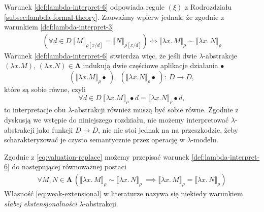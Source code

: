 Warunek \ref{def:lambda-interpret-6} odpowiada regule \((\xi)\) z Rodrozdziału \ref{subsec:lambda-formal-theory}.
Zauważmy wpierw jednak, że zgodnie z warunkiem \ref{def:lambda-interpret-3}
\begin{align*}
  (\forall d\in D\ \llbracket M \rrbracket_{\rho[x/d]}=\llbracket N \rrbracket_{\rho[x/d]})
\iff
\llbracket\lambda x.\,M\rrbracket_\rho \sim \llbracket \lambda x.\,N\rrbracket_\rho 
\tag{\dagger\dagger}\label{eq:valuation-replace}
\end{align*}
Warunek \ref{def:lambda-interpret-6} stwierdza więc, że jeśli dwie \(\lambda\)-abstrakcje 
\((\lambda x. M)\), \((\lambda x. N)\in\mathbf{\Lambda}\) indukują dwie częściowe aplikacje działania \(\bullet\)
\[(\llbracket \lambda x. M \rrbracket_\rho\bullet\ ),\ (\llbracket \lambda x. N \rrbracket_\rho\bullet\ ):\: D\to D,\]
które są sobie równe, czyli
\[
\forall d\in D\ \llbracket \lambda x. M \rrbracket_\rho\bullet d = \llbracket \lambda x. N \rrbracket_\rho\bullet d,
\]
to interpretacje obu \(\lambda\)-abstrakcji również muszą być sobie równe. Zgodnie z dyskusją we wstępie do niniejszego rozdziału,
nie możemy interpretować \(\lambda\)-abstrakcji jako funkcji \(D\to D\), nic nie stoi jednak na na przeszkodzie, żeby scharakteryzować je  
czysto semantycznie przez operację w \(\lambda\)-modelu.




Zgodnie z \eqref{eq:valuation-replace} możemy przepisać warunek \ref{def:lambda-interpret-6} do następującej równoważnej postaci
  \begin{align}
    \forall M,N\in\mathbf{\Lambda}\,\left(\llbracket\lambda x.\,M\rrbracket_\rho \sim \llbracket \lambda x.\,N\rrbracket_\rho\ \implies \llbracket \lambda x.\,M\rrbracket_\rho = \llbracket \lambda x.\,N\rrbracket_\rho\right)\tag{vi'}\label{eq:weak-extensional}
    \end{align}  
Własność \eqref{eq:weak-extensional} w literaturze nazywa się niekiedy warunkiem \emph{słabej ekstensjonalności} \(\lambda\)-abstrakcji.


